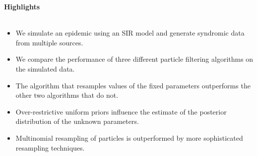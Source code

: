 \documentclass{article}
\begin{document}
{\bf Highlights} \\
\
\begin{itemize}
\item We simulate an epidemic using an SIR model and generate syndromic data from multiple sources.
\item We compare the performance of three different particle filtering algorithms on the simulated data.
\item The algorithm that resamples values of the fixed parameters outperforms the other two algorithms that do not.
\item Over-restrictive uniform priors influence the estimate of the posterior distribution of the unknown parameters.
\item Multinomial resampling of particles is outperformed by more sophisticated resampling techniques.
\end{itemize}
\end{document}
